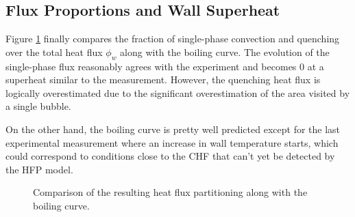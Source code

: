 \subsection{Flux Proportions and Wall Superheat}

Figure \ref{fig:fullkoss_hfp} finally compares the fraction of single-phase convection and quenching over the total heat flux $\phi_{w}$ along with the boiling curve. The evolution of the single-phase flux reasonably agrees with the experiment and becomes 0 at a superheat similar to the measurement. However, the quenching heat flux is logically overestimated due to the significant overestimation of the area visited by a single bubble.

\npar

On the other hand, the boiling curve is pretty well predicted except for the last experimental measurement where an increase in wall temperature starts, which could correspond to conditions close to the CHF that can't yet be detected by the HFP model.

\begin{figure}[!h]
\caption{Comparison of the resulting heat flux partitioning along with the boiling curve.}
\label{fig:fullkoss_hfp}
\end{figure}


